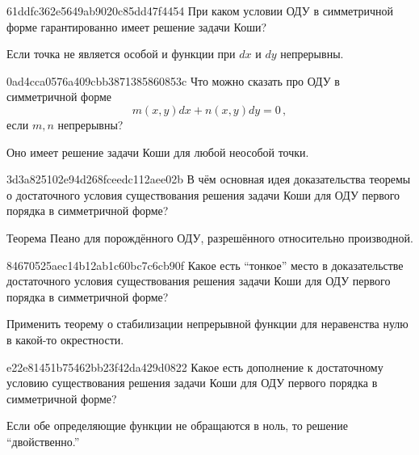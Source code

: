 \begin{note}{61ddfc362e5649ab9020c85dd47f4454}
    При каком условии ОДУ в симметричной форме гарантированно имеет решение задачи Коши?

    \begin{cloze}{1}
        Если точка не является особой и функции при \({ dx }\) и \({ dy }\) непрерывны.
    \end{cloze}
\end{note}

\begin{note}{0ad4cca0576a409cbb3871385860853c}
    Что можно сказать про ОДУ в симметричной форме
    \[
        m(x, y) dx + n(x, y) dy = 0\,,
    \]
    если \({ m, n }\) непрерывны?

    \begin{cloze}{1}
        Оно имеет решение задачи Коши для любой неособой точки.
    \end{cloze}
\end{note}

\begin{note}{3d3a825102e94d268fceedc112aee02b}
    В чём основная идея доказательства теоремы о достаточного условия существования решения задачи Коши для ОДУ первого порядка в симметричной форме?

    \begin{cloze}{1}
        Теорема Пеано для порождённого ОДУ, разрешённого относительно производной.
    \end{cloze}
\end{note}

\begin{note}{84670525aec14b12ab1c60bc7c6cb90f}
    Какое есть ``тонкое'' место в доказательстве достаточного условия существования решения задачи Коши для ОДУ первого порядка в симметричной форме?

    \begin{cloze}{1}
        Применить теорему о стабилизации непрерывной функции для неравенства нулю в какой-то окрестности.
    \end{cloze}
\end{note}

\begin{note}{e22e81451b75462bb23f42da429d0822}
    Какое есть дополнение к достаточному условию существования решения задачи Коши для ОДУ первого порядка в симметричной форме?

    \begin{cloze}{1}
        Если обе определяющие функции не обращаются в ноль, то решение ``двойственно.''
    \end{cloze}
\end{note}

